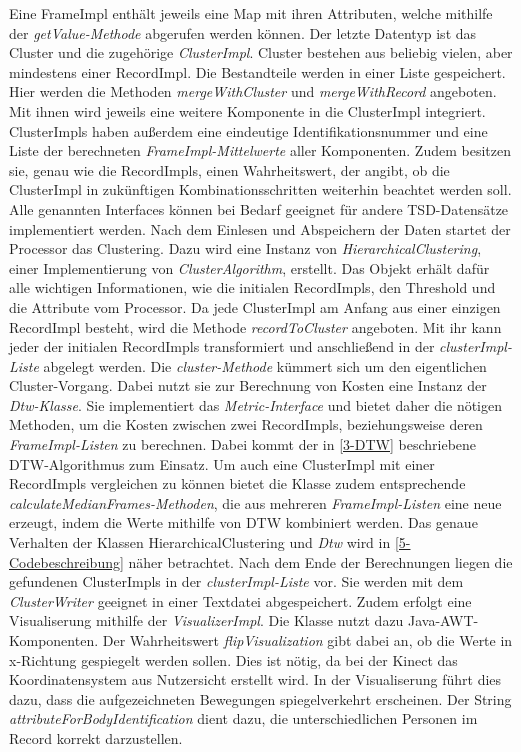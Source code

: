 Eine FrameImpl enthält jeweils eine Map mit ihren Attributen,
welche mithilfe der \emph{getValue-Methode} abgerufen werden können.
Der letzte Datentyp ist das Cluster und die zugehörige \emph{ClusterImpl}.
Cluster bestehen aus beliebig vielen, aber mindestens einer RecordImpl.
Die Bestandteile werden in einer Liste gespeichert.
Hier werden die Methoden \emph{mergeWithCluster} und \emph{mergeWithRecord} angeboten.
Mit ihnen wird jeweils eine weitere Komponente in die ClusterImpl integriert.
ClusterImpls haben außerdem eine eindeutige Identifikationsnummer und eine Liste der berechneten
\emph{FrameImpl-Mittelwerte} aller Komponenten.
Zudem besitzen sie, genau wie die RecordImpls, einen Wahrheitswert, der angibt,
ob die ClusterImpl in zukünftigen Kombinationsschritten weiterhin beachtet werden soll.
Alle genannten Interfaces können bei Bedarf geeignet für andere \ac{TSD}-Datensätze implementiert werden.
Nach dem Einlesen und Abspeichern der Daten startet der Processor das Clustering.
Dazu wird eine Instanz von \emph{HierarchicalClustering}, einer Implementierung von \emph{ClusterAlgorithm}, erstellt.
Das Objekt erhält dafür alle wichtigen Informationen,
wie die initialen RecordImpls, den Threshold und die Attribute vom Processor.
Da jede ClusterImpl am Anfang aus einer einzigen RecordImpl besteht,
wird die Methode \emph{recordToCluster} angeboten.
Mit ihr kann jeder der initialen RecordImpls transformiert
und anschließend in der \emph{clusterImpl-Liste} abgelegt werden.
Die \emph{cluster-Methode} kümmert sich um den eigentlichen Cluster-Vorgang.
Dabei nutzt sie zur Berechnung von Kosten eine Instanz der \emph{Dtw-Klasse}.
Sie implementiert das \emph{Metric-Interface} und bietet daher die nötigen Methoden,
um die Kosten zwischen zwei RecordImpls, beziehungsweise deren \emph{FrameImpl-Listen} zu berechnen.
Dabei kommt der in \autoref{3-DTW} beschriebene \ac{DTW}-Algorithmus zum Einsatz.
Um auch eine ClusterImpl mit einer RecordImpls vergleichen zu können bietet die Klasse zudem entsprechende
\emph{calculateMedianFrames-Methoden}, die aus mehreren \emph{FrameImpl-Listen} eine neue erzeugt,
indem die Werte mithilfe von \ac{DTW} kombiniert werden.
Das genaue Verhalten der Klassen HierarchicalClustering und \emph{Dtw} wird in \autoref{5-Codebeschreibung} näher betrachtet.
Nach dem Ende der Berechnungen liegen die gefundenen ClusterImpls in der \emph{clusterImpl-Liste} vor.
Sie werden mit dem \emph{ClusterWriter} geeignet in einer Textdatei abgespeichert.
Zudem erfolgt eine Visualiserung mithilfe der \emph{VisualizerImpl}.
Die Klasse nutzt dazu Java-AWT-Komponenten.
Der Wahrheitswert \emph{flipVisualization} gibt dabei an,
ob die Werte in x-Richtung gespiegelt werden sollen.
Dies ist nötig, da bei der Kinect das Koordinatensystem aus Nutzersicht erstellt wird.
In der Visualiserung führt dies dazu, dass die aufgezeichneten Bewegungen spiegelverkehrt erscheinen.
Der String \emph{attributeForBodyIdentification} dient dazu,
die unterschiedlichen Personen im Record korrekt darzustellen.

